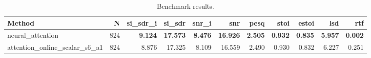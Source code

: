 \begin{table}[t]
\centering
\caption{Benchmark results.}
\label{tab:bench}
\begin{tabular}{lrrrrrrrrrr}
\toprule
Method & N & si\_sdr\_i & si\_sdr & snr\_i & snr & pesq & stoi & estoi & lsd & rtf \\
\midrule
neural_attention & 824 & \textbf{9.124} & \textbf{17.573} & \textbf{8.476} & \textbf{16.926} & \textbf{2.505} & \textbf{0.932} & \textbf{0.835} & \textbf{5.957} & \textbf{0.002} \\
attention_online_scalar_s6_a1 & 824 & 8.876 & 17.325 & 8.109 & 16.559 & 2.490 & 0.930 & 0.832 & 6.227 & 0.251 \\
\bottomrule
\end{tabular}
\end{table}